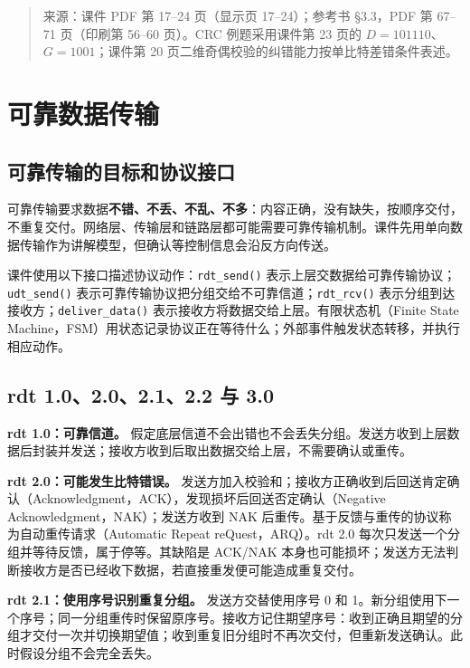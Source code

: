 \begin{quote}\small 来源：课件 PDF 第 17--24 页（显示页 17--24）；参考书 §3.3，PDF 第 67--71 页（印刷第 56--60 页）。CRC 例题采用课件第 23 页的 $D=101110$、$G=1001$；课件第 20 页二维奇偶校验的纠错能力按单比特差错条件表述。\end{quote}

\section{可靠数据传输}

\subsection{可靠传输的目标和协议接口}
可靠传输要求数据\textbf{不错、不丢、不乱、不多}：内容正确，没有缺失，按顺序交付，不重复交付。网络层、传输层和链路层都可能需要可靠传输机制。课件先用单向数据传输作为讲解模型，但确认等控制信息会沿反方向传送。

课件使用以下接口描述协议动作：\texttt{rdt\_send()} 表示上层交数据给可靠传输协议；\texttt{udt\_send()} 表示可靠传输协议把分组交给不可靠信道；\texttt{rdt\_rcv()} 表示分组到达接收方；\texttt{deliver\_data()} 表示接收方将数据交给上层。有限状态机（Finite State Machine，FSM）用状态记录协议正在等待什么；外部事件触发状态转移，并执行相应动作。


\subsection{rdt 1.0、2.0、2.1、2.2 与 3.0}
\textbf{rdt 1.0：可靠信道。} 假定底层信道不会出错也不会丢失分组。发送方收到上层数据后封装并发送；接收方收到后取出数据交给上层，不需要确认或重传。

\textbf{rdt 2.0：可能发生比特错误。} 发送方加入校验和；接收方正确收到后回送肯定确认（Acknowledgment，ACK），发现损坏后回送否定确认（Negative Acknowledgment，NAK）；发送方收到 NAK 后重传。基于反馈与重传的协议称为自动重传请求（Automatic Repeat reQuest，ARQ）。rdt 2.0 每次只发送一个分组并等待反馈，属于停等。其缺陷是 ACK/NAK 本身也可能损坏；发送方无法判断接收方是否已经收下数据，若直接重发便可能造成重复交付。

\textbf{rdt 2.1：使用序号识别重复分组。} 发送方交替使用序号 0 和 1。新分组使用下一个序号；同一分组重传时保留原序号。接收方记住期望序号：收到正确且期望的分组才交付一次并切换期望值；收到重复旧分组时不再次交付，但重新发送确认。此时假设分组不会完全丢失。

